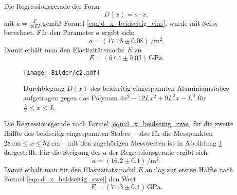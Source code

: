 Die Regressionsgerade der Form
\begin{equation*}
	D(x) = a \cdot x \mathrm{,}
\end{equation*}
mit $a = \frac{F}{48EI}$ gemäß Formel \eqref{eqn:d_x_beidseitig_eins}, wurde mit Scipy
\cite{scipy} berechnet.
Für den Parameter $a$ ergibt sich:
\begin{equation*}
	a = (17.18 \pm 0.08) \, \si{\per\square\meter} \mathrm{.}
\end{equation*}
Damit erhält man den Elastizitätsmodul $E$ zu
\begin{equation*}
	E = (67.4 \pm 0.03) \, \si{\giga\pascal} \mathrm{.}
\end{equation*}
\begin{figure}
	\centering
	\texttt{[image: Bilder/c2.pdf]}
	\caption{Durchbiegung $D(x)$ des beidseitig eingespannten Aluminiumstabes aufgetragen gegen das Polynom $4x^3 - 12Lx^2 + 9L^2x - L^3$ für $\frac{L}{2} \leq x \leq L$.}
	\label{fig:StabusMaximus}
\end{figure}

Die Regressionsgerade nach Formel \eqref{eqn:d_x_beidseitig_zwei} für die zweite Hälfte
des beidseitig eingespannten Stabes -- also für die 
Messpunkten $\SI{28}{\centi\meter} \leq x \leq \SI{52}{\centi\meter}$ --  mit den
zugehörigen Messwerten ist in Abbildung \ref{fig:StabusMaximus} dargestellt.
Für die Steigung der $a$ der Regressionsgerade ergibt sich
\begin{equation*}
	a = (16.2\pm 0.1)\,\si{\per\square\meter}  \mathrm{.}
\end{equation*}
Damit erhält man für den Elastizitätsmodul $E$ analog zur ersten Hälfte nach Formel 
\eqref{eqn:d_x_beidseitig_zwei} den Wert
\begin{equation*}
	E =(71.3 \pm 0.4) \, \si{\giga\pascal} \mathrm{.}
\end{equation*}
